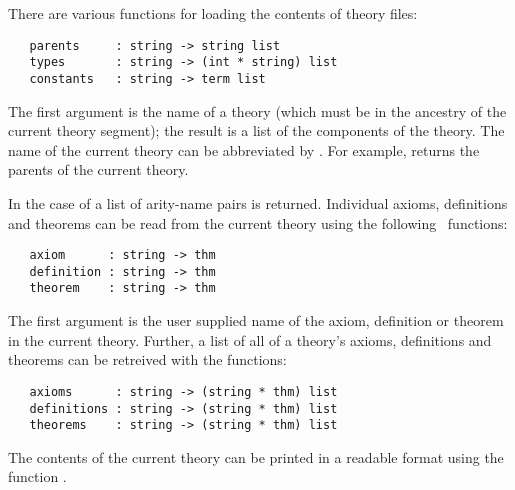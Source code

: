 There are various functions for loading the contents of theory files:

\begin{holboxed}
\begin{verbatim}
   parents     : string -> string list
   types       : string -> (int * string) list
   constants   : string -> term list
\end{verbatim}
\end{holboxed}

\noindent The first argument is the name of a theory (which must be in the
ancestry of the current theory segment); the result is a list of the
components of the theory. The name of the current theory can be
abbreviated by .
%
%
For example,  returns the parents of the current
theory.

In the case of  a list of arity-name pairs is returned.
Individual axioms, definitions and theorems can be read from the
current theory using the following \ML\ functions:

\begin{holboxed}
\begin{verbatim}
   axiom      : string -> thm
   definition : string -> thm
   theorem    : string -> thm
\end{verbatim}
\end{holboxed}

\noindent The first argument is the user supplied name of the axiom,
definition or theorem in the current theory.  Further, a list of all
of a theory's axioms, definitions and theorems can be retreived with
the \ML{} functions:

\begin{holboxed}
\begin{verbatim}
   axioms      : string -> (string * thm) list
   definitions : string -> (string * thm) list
   theorems    : string -> (string * thm) list
\end{verbatim}
\end{holboxed}

The contents of the current theory can be printed in a readable format
using the function .
%

